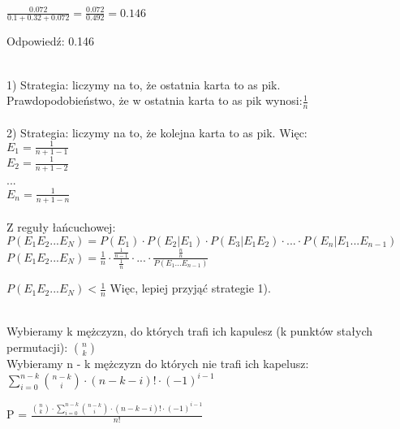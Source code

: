 \documentclass[fleqn]{article}
\begin{document}
$\frac{0.072}{0.1 + 0.32 + 0.072} = \frac{0.072}{0.492} = 0.146$

Odpowiedź: 0.146

\medskip


 \\

1) Strategia: liczymy na to, że ostatnia karta to as pik. \\
Prawdopodobieństwo, że w ostatnia karta to as pik wynosi:$ \frac{1}{n}\quad$ \\
\\
2) Strategia: liczymy na to, że kolejna karta to as pik.
Więc:\\
$E_{1} =  \frac{1}{n + 1 - 1}\quad$ \\
$E_{2} = \frac{1}{n + 1 - 2}\quad$ \\
...\\
$E_{n} = \frac{1}{n + 1 - n}\quad$ \\ \\
Z reguły łańcuchowej: \\
$P(E_{1}E_{2}...E_{N}) = P(E_{1}) \cdot P(E_{2}| E_{1}) \cdot P(E_{3}|E_{1}E_{2}) \cdot ... \cdot P(E_{n}|E_{1}...E_{n-1})$\\
$P(E_{1}E_{2}...E_{N}) = \frac{1}{n} \cdot \frac{\frac{1}{n-1}}{\frac{1}{n}} \cdot ... \cdot \frac{\frac{n}{n}}{P(E_{1}...E_{n-1})} $

$ P(E_{1}E_{2}...E_{N}) < \frac{1}{n}$
Więc, lepiej przyjąć strategie 1).
\medskip

\medskip


 \\
Wybieramy k mężczyzn, do których trafi ich kapulesz (k punktów stałych permutacji): ${n}\choose{k}$\\
Wybieramy n - k mężczyzn do których nie trafi ich kapelusz:\\ $\sum_{i=0}^{n-k} {{n-k}\choose{i}}  \cdot (n-k-i)! \cdot (-1)^{i-1} $

P =  $  \frac{{{n}\choose{k}} \cdot{\sum_{i=0}^{n-k} {{n-k}\choose{i}}  \cdot (n-k-i)! \cdot (-1)^{i-1}}  }{n!} $




\medskip
\end{document}
